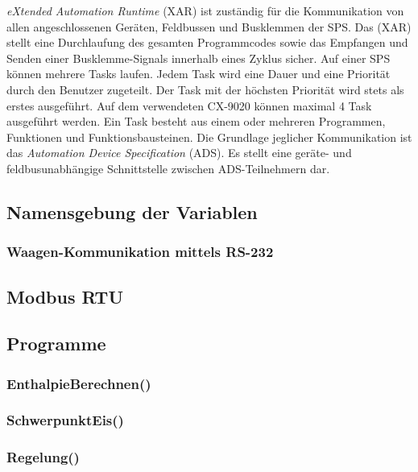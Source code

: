 \textit{eXtended Automation Runtime} (XAR) ist zuständig für die Kommunikation von allen angeschlossenen Geräten, Feldbussen und Busklemmen der SPS. Das (XAR) stellt eine Durchlaufung des gesamten Programmcodes sowie das Empfangen und Senden einer Busklemme-Signals innerhalb eines Zyklus sicher. Auf einer SPS können mehrere Tasks laufen. Jedem Task wird eine Dauer und eine Priorität durch den Benutzer zugeteilt. Der Task mit der höchsten Priorität wird stets als erstes ausgeführt. Auf dem verwendeten CX-9020 können maximal 4 Task ausgeführt werden. Ein Task besteht aus einem oder mehreren Programmen, Funktionen und Funktionsbausteinen.  Die Grundlage jeglicher Kommunikation ist das \textit{Automation Device Specification} (ADS). Es stellt eine geräte- und feldbusunabhängige Schnittstelle zwischen ADS-Teilnehmern dar. 

\subsection{Namensgebung der Variablen}
\label{subsec: Namensgebung}

\subsubsection{Waagen-Kommunikation mittels RS-232}
\label{subsec:RS-232}

\subsection{Modbus RTU}
\label{subsec:Modbus RTU}

\subsection{Programme}
\label{subsec:Programme}

\subsubsection*{EnthalpieBerechnen()}

\subsubsection*{SchwerpunktEis()}

\subsubsection*{Regelung()}


